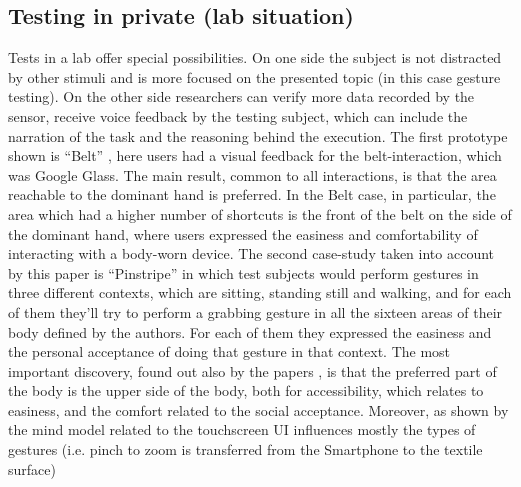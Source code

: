 \documentclass{sigchi}
\begin{document}
\subsection{Testing in private (lab situation)}
Tests in a lab offer special possibilities. On one side the subject is not distracted by other stimuli and is more focused on the presented topic (in this case gesture testing). On the other side researchers can verify more data recorded by the sensor, receive voice feedback by the testing subject, which can include the narration of the task and the reasoning behind the execution.
The first prototype shown is ``Belt'' \cite{belt}, here users had a visual feedback for the belt-interaction, which was Google Glass. The main result, common to all interactions, is that the area reachable to the dominant hand is preferred. In the Belt case, in particular, the area which had a higher number of shortcuts is the front of the belt on the side of the dominant hand, where users expressed the easiness and comfortability of interacting with a body-worn device. The second case-study taken into account by this paper is ``Pinstripe'' \cite{pinstripe} in which test subjects would perform gestures in three different contexts, which are sitting, standing still and walking, and for each of them they’ll try to perform a grabbing gesture in all the sixteen areas of their body defined by the authors. For each of them they expressed the easiness and the personal acceptance of doing that gesture in that context. The most important discovery, found out also by the papers \cite{social-comfort, belt,more-touch}, is that the preferred part of the body is the upper side of the body, both for accessibility, which relates to easiness, and the comfort related to the social acceptance.
Moreover, as shown by \cite{more-touch} the mind model related to the touchscreen UI influences mostly the types of gestures (i.e. pinch to zoom is transferred from the Smartphone to the textile surface)
\end{document}
